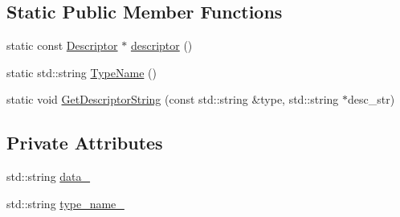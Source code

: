 \subsection*{Static Public Member Functions}
\begin{DoxyCompactItemize}
\item 
static const \hyperlink{classapollo_1_1cyber_1_1message_1_1PyMessageWrap_1_1Descriptor}{Descriptor} $\ast$ \hyperlink{classapollo_1_1cyber_1_1message_1_1PyMessageWrap_ae1a16e7f449dc7d1e9b0f6e0ccf35e29}{descriptor} ()
\item 
static std\-::string \hyperlink{classapollo_1_1cyber_1_1message_1_1PyMessageWrap_a9941457c59045d4e919fc461ab421fc9}{Type\-Name} ()
\item 
static void \hyperlink{classapollo_1_1cyber_1_1message_1_1PyMessageWrap_a4f86413a70bab63821d62eee7b16d3f2}{Get\-Descriptor\-String} (const std\-::string \&type, std\-::string $\ast$desc\-\_\-str)
\end{DoxyCompactItemize}
\subsection*{Private Attributes}
\begin{DoxyCompactItemize}
\item 
std\-::string \hyperlink{classapollo_1_1cyber_1_1message_1_1PyMessageWrap_ac44859ce8f9f14415236f122a8594e14}{data\-\_\-}
\item 
std\-::string \hyperlink{classapollo_1_1cyber_1_1message_1_1PyMessageWrap_a91c454f1972daa37cd846a0bd436d19b}{type\-\_\-name\-\_\-}
\end{DoxyCompactItemize}


